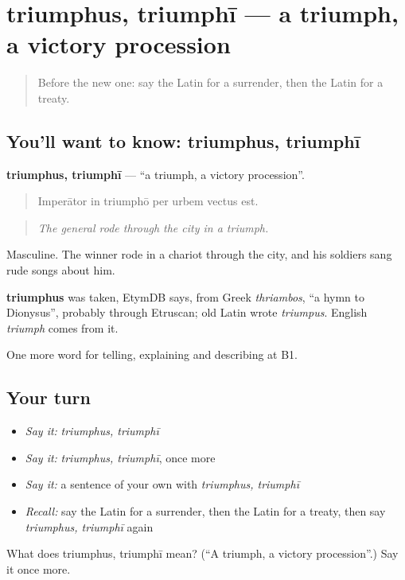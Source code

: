 \section[triumphus, triumphī]{triumphus, triumphī — a triumph, a victory procession}

\label{lesson:LA-C343-triumphus}



\begin{quote}
Before the new one: say the Latin for a surrender, then the Latin for a treaty.
\end{quote}

\subsection*{You'll want to know: triumphus, triumphī}
\textbf{triumphus, triumphī} — \textquotedblleft{}a triumph, a victory procession\textquotedblright{}.

\begin{quote}
Imperātor in triumphō per urbem vectus est.
\end{quote}

\begin{quote}
\emph{The general rode through the city in a triumph.}
\end{quote}

Masculine. The winner rode in a chariot through the city, and his soldiers sang rude songs about him.

\begin{cousinweb}
\textbf{triumphus} was taken, EtymDB says, from Greek \emph{thriambos}, \textquotedblleft{}a hymn to Dionysus\textquotedblright{}, probably through Etruscan; old Latin wrote \emph{triumpus}. English \emph{triumph} comes from it.
\end{cousinweb}

\begin{grammarlens}[title={What you've built}]
One more word for telling, explaining and describing at B1.
\end{grammarlens}

\subsection*{Your turn}
\begin{itemize}
\raggedright
  \item \emph{Say it:} \emph{triumphus, triumphī}
  \item \emph{Say it:} \emph{triumphus, triumphī}, once more
  \item \emph{Say it:} a sentence of your own with \emph{triumphus, triumphī}
  \item \emph{Recall:} say the Latin for a surrender, then the Latin for a treaty, then say \emph{triumphus, triumphī} again
\end{itemize}

\begin{tcolorbox}[breakable,colback=teal!4,colframe=teal!35!black,title={Before you move on}]
What does triumphus, triumphī mean? (\textquotedblleft{}A triumph, a victory procession\textquotedblright{}.) Say it once more.
\end{tcolorbox}
